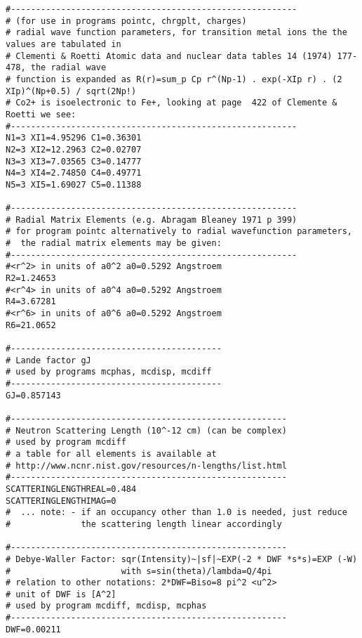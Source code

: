\begin{verbatim}
#---------------------------------------------------------
# (for use in programs pointc, chrgplt, charges) 
# radial wave function parameters, for transition metal ions the the values are tabulated in
# Clementi & Roetti Atomic data and nuclear data tables 14 (1974) 177-478, the radial wave
# function is expanded as R(r)=sum_p Cp r^(Np-1) . exp(-XIp r) . (2 XIp)^(Np+0.5) / sqrt(2Np!)
# Co2+ is isoelectronic to Fe+, looking at page  422 of Clemente & Roetti we see:
#---------------------------------------------------------
N1=3 XI1=4.95296 C1=0.36301 
N2=3 XI2=12.2963 C2=0.02707 
N3=3 XI3=7.03565 C3=0.14777
N4=3 XI4=2.74850 C4=0.49771 
N5=3 XI5=1.69027 C5=0.11388 

#---------------------------------------------------------
# Radial Matrix Elements (e.g. Abragam Bleaney 1971 p 399)
# for program pointc alternatively to radial wavefunction parameters,
#  the radial matrix elements may be given:
#---------------------------------------------------------
#<r^2> in units of a0^2 a0=0.5292 Angstroem
R2=1.24653
#<r^4> in units of a0^4 a0=0.5292 Angstroem
R4=3.67281
#<r^6> in units of a0^6 a0=0.5292 Angstroem
R6=21.0652

#------------------------------------------
# Lande factor gJ
# used by programs mcphas, mcdisp, mcdiff
#------------------------------------------
GJ=0.857143

#-------------------------------------------------------
# Neutron Scattering Length (10^-12 cm) (can be complex)
# used by program mcdiff
# a table for all elements is available at 
# http://www.ncnr.nist.gov/resources/n-lengths/list.html
#-------------------------------------------------------
SCATTERINGLENGTHREAL=0.484
SCATTERINGLENGTHIMAG=0
#  ... note: - if an occupancy other than 1.0 is needed, just reduce 
#              the scattering length linear accordingly

#-------------------------------------------------------
# Debye-Waller Factor: sqr(Intensity)~|sf|~EXP(-2 * DWF *s*s)=EXP (-W)
#                      with s=sin(theta)/lambda=Q/4pi
# relation to other notations: 2*DWF=Biso=8 pi^2 <u^2>
# unit of DWF is [A^2]
# used by program mcdiff, mcdisp, mcphas
#-------------------------------------------------------
DWF=0.00211


\end{verbatim}
